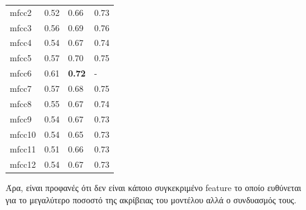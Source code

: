 \begin{table}[h]
\begin{tabular}{llll}
mfcc2                   & 0.52                        & 0.66                       & 0.73                       \\
mfcc3                   & 0.56                        & 0.69                       & 0.76                       \\
mfcc4                   & 0.54                        & 0.67                       & 0.74                       \\
mfcc5                   & 0.57                        & 0.70                       & 0.75                       \\
mfcc6                   & 0.61                        & \textbf{0.72}              & -                          \\
mfcc7                   & 0.57                        & 0.68                       & 0.75                       \\
mfcc8                   & 0.55                        & 0.67                       & 0.74                       \\
mfcc9                   & 0.54                        & 0.67                       & 0.73                       \\
mfcc10                  & 0.54                        & 0.65                       & 0.73                       \\
mfcc11                  & 0.51                        & 0.66                       & 0.73                       \\
mfcc12                  & 0.54                        & 0.67                       & 0.73                      
\end{tabular}
\end{table}

Άρα, είναι προφανές ότι δεν είναι κάποιο συγκεκριμένο feature το οποίο ευθύνεται για το μεγαλύτερο ποσοστό της ακρίβειας του μοντέλου αλλά ο συνδυασμός τους.









